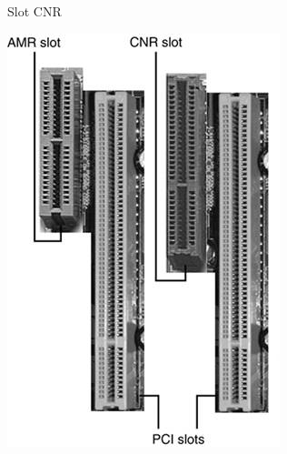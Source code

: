 \documentclass[aspectratio=43]{beamer}
\begin{document}
\begin{frame}{Slot CNR}
	\begin{center}
		\includegraphics[width=0.45\linewidth]{extrahovane_obrazky/cnr.jpeg}
	\end{center}
	
\end{frame}
\end{document}

